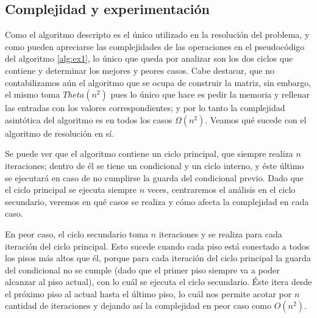 \documentclass{article}
\theoremstyle{definition}
\theoremstyle{remark}
\begin{document}
\subsection{Complejidad y experimentación}

Como el algoritmo descripto es el único utilizado en la resolución del problema, y como pueden apreciarse las complejidades de las operaciones en el pseudocódigo del algoritmo \ref{alg:ex1}, lo único que queda por analizar son los dos ciclos que contiene y determinar los mejores y peores casos. Cabe destacar, que no contabilizamos aún el algoritmo que se ocupa de construir la matriz, sin embargo, el mismo toma $Theta(n^2)$ pues lo único que hace es pedir la memoria y rellenar las entradas con los valores correspondientes; y por lo tanto la complejidad asintótica del algoritmo es en todos los casos $\Omega(n^2)$. Veamos qué sucede con el algoritmo de resolución en sí.

Se puede ver que el algoritmo contiene un ciclo principal, que siempre realiza $n$ iteraciones; dentro de él se tiene un condicional y un ciclo interno, y éste último se ejecutará en caso de no cumplirse la guarda del condicional previo. Dado que el ciclo principal se ejecuta siempre $n$ veces, centraremos el análisis en el ciclo secundario, veremos en qué casos se realiza y cómo afecta la complejidad en cada caso.

En peor caso, el ciclo secundario toma $n$ iteraciones y se realiza para cada iteración del ciclo principal. Esto sucede cuando cada piso está conectado a todos los pisos más altos que él, porque para cada iteración del ciclo principal la guarda del condicional no se cumple (dado que el primer piso siempre va a poder alcanzar al piso actual), con lo cuál se ejecuta el ciclo secundario. Éste itera desde el próximo piso al actual hasta el último piso, lo cuál nos permite acotar por $n$ cantidad de iteraciones y dejando así la complejidad en peor caso como $O(n^2)$.
\end{document}
